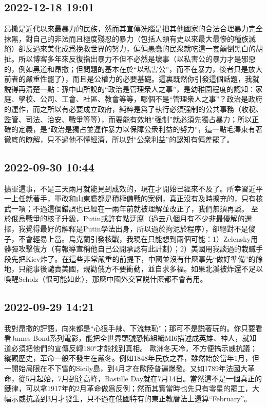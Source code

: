 \documentclass[twocolumn]{ctexart}
\begin{document}
\subsection*{2022-12-18 19:01}

昂撒是近代以來最暴力的民族，然而其宣傳洗腦是把其他國家的合法合理暴力完全抹黑，對自己的非法而且極度殘忍的暴力（包括人類有史以來最大最慘的種族滅絕）卻反過來美化成爲挽救世界的努力，偏偏愚蠢的民衆就吃這一套顛倒黑白的胡扯。所以博客多年來反復指出暴力不但不必然是壞事（以私害公的暴力才是邪惡的，例如黑道和昂撒；但問題的基本在於“以私害公”，而不在暴力，後者只是放大前者的嚴重性罷了），而且是公權力的必要基礎。這裏既然你引發這個話題，我就説得再清楚一點：孫中山所說的“政治是管理衆人之事”，是幼稚園程度的認知：家庭、學校、公司、工會、社區、教會等等，哪個不是“管理衆人之事”？政治是政府的運作，而之所以有必要成立政府，純粹是爲了執行必須强制的公共事務（收稅、監管、司法、治安、戰爭等等），而要能有效地“强制”就必須先獨占暴力；所以正確的定義，是“政治是獨占並運作暴力以保障公衆利益的努力”，這一點毛澤東有著徹底的瞭解，只不過他不懂經濟，所以對“公衆利益”的認知有偏差罷了。
\subsection*{2022-09-30 10:44}

擴軍這事，不是三天兩月就能見到成效的，現在才開始已經來不及了。所幸習近平一上任就著手，軍改和山東艦都是積極備戰的案例，真正沒有及時擴充的，只有核武一項；不過這個錯誤也已經在一兩年前就被理解並改正了，我們無須再談。
至於俄烏戰爭的核子升級，Putin或許有點迂腐（過去八個月有不少非最優解的選擇，我覺得最好的解釋是Putin學法出身，所以過於拘泥於程序），卻絕對不是傻子，不會輕易上當。烏克蘭引發核戰，我現在只能想到兩個可能：1）Zelensky用髒彈攻擊俄方（有報導宣稱他自己公開承認有此計劃）；2）美國用我談過的栽贓手段先把Kiev炸了。在這些非常嚴重的前提下，中國並沒有什麽事先“做好準備”的餘地，只能事後譴責美國，規勸俄方不要衝動，並自求多福。如果北溪被炸還不足以喚醒Scholz（很可能如此），那麽中國外交官説什麽都不會有用。
\subsection*{2022-09-29 14:21}

我對昂撒的評語，向來都是“心狠手辣、下流無恥”；那可不是説著玩的。你只要看看James Bond系列電影，能把全世界頭號恐怖組織MI6描述成英雄、神人，就知道必須把他們的宣傳反轉180°才能找到真相。
歐洲冬天冷，不方便搞示威抗議；縱觀歷史，革命一般不發生在嚴冬。例如1848年民族之春，雖然始於當年1月，但一開始局限在不下雪的Sicily島，到4月才在歐陸普遍爆發。又如1789年法國大革命，從5月起始，7月到達高峰，Bastille Day就在7月14日。當然這不是一個真正的鐵律，可以拿1917年的2月革命做爲反例；然而其實當時也先只有零星的罷工，大幅示威抗議到3月才發生，只不過在俄國特有的東正教曆法上還算“February”。
\end{document}
